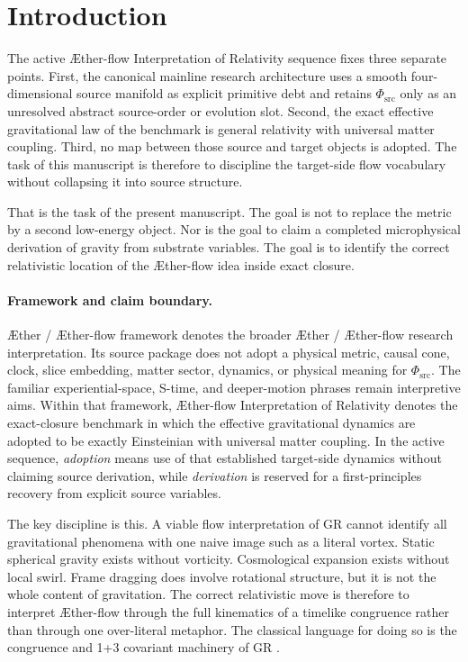 \documentclass[11pt]{article}
\newcommand{\Aether}{\AE{}ther}
\newcommand{\Aflow}{\AE{}ther-flow}
\newcommand{\TheoryName}{\Aflow{} Interpretation of Relativity}
\newcommand{\TheoryProgram}{\Aether{} / \Aflow{} framework}
\newcommand{\PhiSrc}{\Phi_{\mathrm{src}}}
\begin{document}
\section{Introduction}

The active \TheoryName{} sequence fixes three separate points. First, the
canonical mainline research architecture uses a smooth four-dimensional
source manifold as explicit primitive debt and retains \(\PhiSrc\) only as an
unresolved abstract source-order or evolution slot. Second, the exact
effective gravitational law of the benchmark is general relativity with
universal matter coupling. Third, no map between those source and target
objects is adopted. The task of this manuscript is therefore to discipline the
target-side flow vocabulary without collapsing it into source structure.

That is the task of the present manuscript. The goal is not to replace the metric by a second low-energy object. Nor is the goal to claim a completed microphysical derivation of gravity from substrate variables. The goal is to identify the correct relativistic location of the \Aflow{} idea inside exact closure.

\paragraph{Framework and claim boundary.}
\TheoryProgram{} denotes the broader \Aether{} / \Aflow{} research
interpretation. Its source package does not adopt a physical metric, causal
cone, clock, slice embedding, matter sector, dynamics, or physical meaning for
\(\PhiSrc\). The familiar experiential-space, S-time, and deeper-motion
phrases remain interpretive aims. Within that framework, \TheoryName{} denotes
the exact-closure benchmark in which the effective gravitational dynamics are
adopted to be exactly Einsteinian with universal matter coupling. In the
active sequence, \emph{adoption} means use of that established target-side
dynamics without claiming source derivation, while \emph{derivation} is
reserved for a first-principles recovery from explicit source variables.

The key discipline is this. A viable flow interpretation of GR cannot identify all gravitational phenomena with one naive image such as a literal vortex. Static spherical gravity exists without vorticity. Cosmological expansion exists without local swirl. Frame dragging does involve rotational structure, but it is not the whole content of gravitation. The correct relativistic move is therefore to interpret \Aflow{} through the full kinematics of a timelike congruence rather than through one over-literal metaphor. The classical language for doing so is the congruence and 1+3 covariant machinery of GR \cite{Raychaudhuri1955,EllisVanElst1999}.
\end{document}
